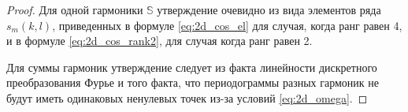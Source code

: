 \documentclass[specialist,
               substylefile = spbu.rtx,
               subf,href,colorlinks=true, 12pt]{disser}
\begin{document}
\begin{proof}
Для одной гармоники $\mathbb{S}$ утверждение очевидно из вида элементов ряда $s_m(k,l)$, приведенных в формуле \eqref{eq:2d_cos_el} для случая, когда ранг равен 4, и в формуле \eqref{eq:2d_cos_rank2}, для случая когда ранг равен 2.

Для суммы гармоник утверждение следует из факта линейности дискретного преобразования Фурье и того факта, что периодограммы разных гармоник не будут иметь одинаковых ненулевых точек из-за условий \eqref{eq:2d_omega}.
\end{proof}

%
%
%
\end{document}
